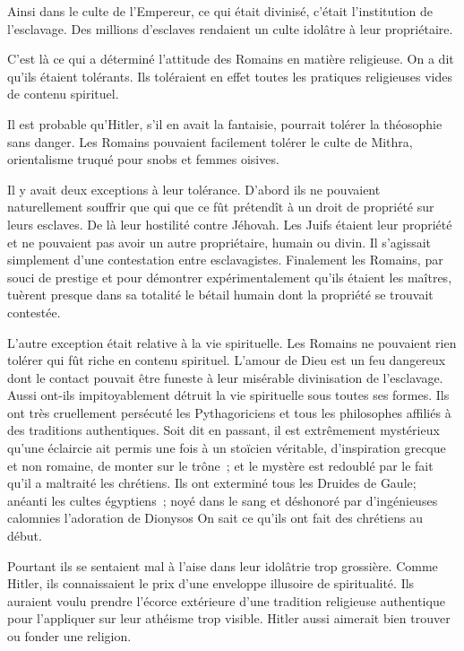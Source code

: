 \documentclass[french,twoside]{book} %
\begin{document}
Ainsi dans le culte de l'Empereur, ce qui était divinisé, c'était l'institution de l'esclavage. Des millions d'esclaves rendaient un culte idolâtre à leur propriétaire.\par
C'est là ce qui a déterminé l'attitude des Romains en matière religieuse. On a dit qu'ils étaient tolérants. Ils toléraient en effet toutes les pratiques religieuses vides de contenu spirituel.\par
Il est probable qu'Hitler, s'il en avait la fantaisie, pourrait tolérer la théosophie sans danger. Les Romains pouvaient facilement tolérer le culte de Mithra, orientalisme truqué pour snobs et femmes oisives.\par
Il y avait deux exceptions à leur tolérance. D'abord ils ne pouvaient naturellement souffrir que qui que ce fût prétendît à un droit de propriété sur leurs esclaves. De là leur hostilité contre Jéhovah. Les Juifs étaient leur propriété et ne pouvaient pas avoir un autre propriétaire, humain ou divin. Il s'agissait simplement d'une contestation entre esclavagistes. Finalement les Romains, par souci de prestige et pour démontrer expérimentalement qu'ils étaient les maîtres, tuèrent presque dans sa totalité le bétail humain dont la propriété se trouvait contestée.\par
L'autre exception était relative à la vie spirituelle. Les Romains ne pouvaient rien tolérer qui fût riche en contenu spirituel. L'amour de Dieu est un feu dangereux dont le contact pouvait être funeste à leur misérable divinisation de l'esclavage. Aussi ont-ils impitoyablement détruit la vie spirituelle sous toutes ses formes. Ils ont très cruellement persécuté les Pythagoriciens et tous les philosophes affiliés à des traditions authentiques. Soit dit en passant, il est extrêmement mystérieux qu'une éclaircie ait permis une fois à un stoïcien véritable, d'inspiration grecque et non romaine, de monter sur le trône ; et le mystère est redoublé par le fait qu'il a maltraité les chrétiens. Ils ont exterminé tous les Druides de Gaule; anéanti les cultes égyptiens ; noyé dans le sang et déshonoré par d'ingénieuses calomnies l'adoration de Dionysos On sait ce qu'ils ont fait des chrétiens au début.\par
Pourtant ils se sentaient mal à l'aise dans leur idolâtrie trop grossière. Comme Hitler, ils connaissaient le prix d'une enveloppe illusoire de spiritualité. Ils auraient voulu prendre l'écorce extérieure d'une tradition religieuse authentique pour l'appliquer sur leur athéisme trop visible. Hitler aussi aimerait bien trouver ou fonder une religion.\par
\end{document}
